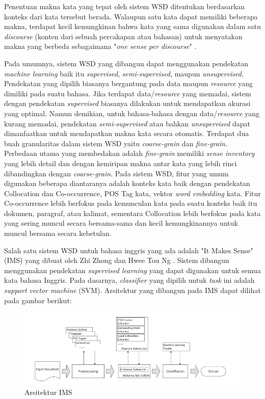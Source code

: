 Penentuan makna kata yang tepat oleh sistem WSD ditentukan berdasarkan konteks dari kata tersebut berada. Walaupun satu kata dapat memiliki beberapa makna, terdapat kecil kemungkinan bahwa kata yang sama digunakan dalam satu \textit{discourse} (konten dari sebuah percakapan atau bahasan) untuk menyatakan makna yang berbeda sebagaimana "\textit{one sense per discourse}" \citep{gale1992one}.

Pada umumnya, sistem WSD yang dibangun dapat menggunakan pendekatan \textit{machine learning} baik itu \textit{supervised}, \textit{semi-supervised}, maupun \textit{unsupervised}. Pendekatan yang dipilih biasanya bergantung pada data maupun \textit{resource} yang dimiliki pada suatu bahasa. Jika terdapat data/\textit{resource} yang memadai, sistem dengan pendekatan \textit{supervised} biasanya dilakukan untuk mendapatkan akurasi yang optimal. Namun demikian, untuk bahasa-bahasa dengan data/\textit{resource} yang kurang memadai, pendekatan \textit{semi-supervised} atau bahkan \textit{unsupervised} dapat dimanfaatkan untuk mendapatkan makna kata secara otomatis. Terdapat dua buah granularitas dalam sistem WSD yaitu \textit{coarse-grain} dan \textit{fine-grain}. Perbedaan utama yang membedakan adalah \textit{fine-grain} memiliki \textit{sense inventory} yang lebih detail dan dengan kemiripan makna antar kata yang lebih rinci dibandingkan dengan \textit{coarse-grain}. Pada sistem WSD, fitur yang umum digunakan beberapa diantaranya adalah konteks kata baik dengan pendekatan Collocation dan Co-occurrence, POS Tag kata, vektor \textit{word embedding} kata. Fitur Co-occurrence lebih berfokus pada kemunculan kata pada suatu konteks baik itu dokumen, paragraf, atau kalimat, sementara Collocation lebih berfokus pada kata yang sering muncul secara bersama-sama dan kecil kemungkinannya untuk muncul bersama secara kebetulan. 

Salah satu sistem WSD untuk bahasa inggris yang ada adalah "It Makes Sense" (IMS) yang dibuat oleh Zhi Zhong dan Hwee Tou Ng \citep{zhong2010makes}. Sistem  dibangun menggunakan pendekatan \textit{supervised learning} yang dapat digunakan untuk semua kata bahasa Inggris. Pada dasarnya, \textit{classifier} yang dipilih untuk \textit{task} ini adalah \textit{support vector machine} (SVM). Arsitektur yang dibangun pada IMS dapat dilihat pada gambar berikut:

\begin{figure}
	\centering
	\includegraphics[width=1\linewidth]{adit_pics/Arsitektur-IMS}
	\caption{Arsitektur IMS}
	\label{fig:Arsitektur-IMS}
\end{figure}

